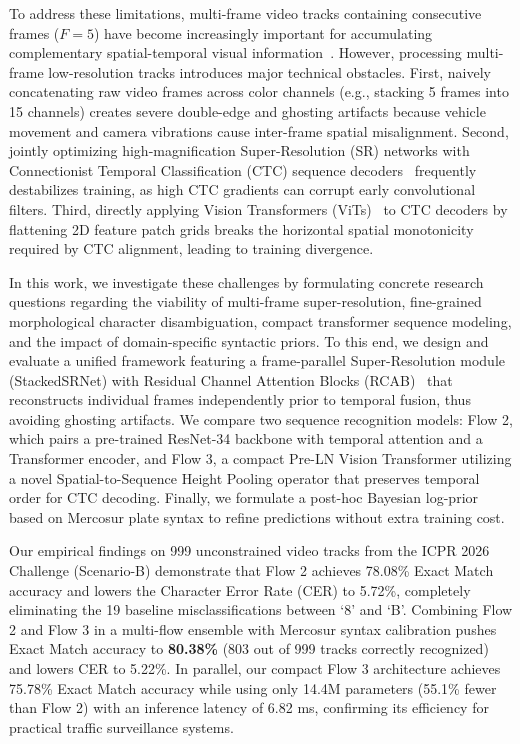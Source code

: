 \documentclass[sigconf]{acmart}
\begin{document}
To address these limitations, multi-frame video tracks containing consecutive frames ($F = 5$) have become increasingly important for accumulating complementary spatial-temporal visual information~\cite{icpr2026lrlpr}. However, processing multi-frame low-resolution tracks introduces major technical obstacles. First, naively concatenating raw video frames across color channels (e.g., stacking 5 frames into 15 channels) creates severe double-edge and ghosting artifacts because vehicle movement and camera vibrations cause inter-frame spatial misalignment. Second, jointly optimizing high-magnification Super-Resolution (SR) networks with Connectionist Temporal Classification (CTC) sequence decoders~\cite{graves2006ctc} frequently destabilizes training, as high CTC gradients can corrupt early convolutional filters. Third, directly applying Vision Transformers (ViTs)~\cite{dosovitskiy2020vit} to CTC decoders by flattening 2D feature patch grids breaks the horizontal spatial monotonicity required by CTC alignment, leading to training divergence.

In this work, we investigate these challenges by formulating concrete research questions regarding the viability of multi-frame super-resolution, fine-grained morphological character disambiguation, compact transformer sequence modeling, and the impact of domain-specific syntactic priors. To this end, we design and evaluate a unified framework featuring a frame-parallel Super-Resolution module (StackedSRNet) with Residual Channel Attention Blocks (RCAB)~\cite{zhang2018rcan} that reconstructs individual frames independently prior to temporal fusion, thus avoiding ghosting artifacts. We compare two sequence recognition models: Flow 2, which pairs a pre-trained ResNet-34 backbone with temporal attention and a Transformer encoder, and Flow 3, a compact Pre-LN Vision Transformer utilizing a novel Spatial-to-Sequence Height Pooling operator that preserves temporal order for CTC decoding. Finally, we formulate a post-hoc Bayesian log-prior based on Mercosur plate syntax to refine predictions without extra training cost.

Our empirical findings on 999 unconstrained video tracks from the ICPR 2026 Challenge (Scenario-B) demonstrate that Flow 2 achieves 78.08\% Exact Match accuracy and lowers the Character Error Rate (CER) to 5.72\%, completely eliminating the 19 baseline misclassifications between `8' and `B'. Combining Flow 2 and Flow 3 in a multi-flow ensemble with Mercosur syntax calibration pushes Exact Match accuracy to \textbf{80.38\%} (803 out of 999 tracks correctly recognized) and lowers CER to 5.22\%. In parallel, our compact Flow 3 architecture achieves 75.78\% Exact Match accuracy while using only 14.4M parameters (55.1\% fewer than Flow 2) with an inference latency of 6.82 ms, confirming its efficiency for practical traffic surveillance systems.
\end{document}
